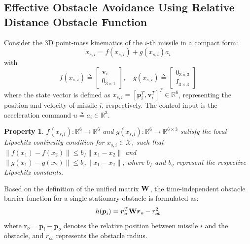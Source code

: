 \documentclass[lettersize,journal]{IEEEtran}
\newtheorem{property}{Property}
\begin{document}
\subsection{Effective Obstacle Avoidance Using Relative Distance Obstacle Function}
Consider the 3D point-mass kinematics of the $i$-th missile in a compact form:
\begin{equation}
	\label{obs_state}
	{\dot x_{s,i}} = f({x_{s,i}}) + g({x_{s,i}}){a_i}
\end{equation}
with
\begin{equation}
	f({x_{s,i}}) \triangleq \begin{bmatrix} {{\boldsymbol{v}}_i} \\ 0_{3\times1} \end{bmatrix}, \quad 
	g({x_{s,i}}) \triangleq \begin{bmatrix} 0_{3\times3} \\ I_{3\times3} \end{bmatrix}
\end{equation}
where the state vector is defined as $x_{s,i} = [{\boldsymbol{p}}_i^T, {\boldsymbol{v}}_i^T]^T \in \mathbb{R}^6$, representing the position and velocity of missile $i$, respectively. The control input is the acceleration command $u \triangleq a_i \in \mathbb{R}^3$. 
\vspace{1mm}
\begin{property}
	\label{Lipschitz}
	$f({x_{s,i}}): \mathbb{R}^6 \rightarrow \mathbb{R}^6$ and $g({x_{s,i}}): \mathbb{R}^6 \rightarrow \mathbb{R}^{6 \times 3}$ satisfy the local Lipschitz continuity condition for $x_{s,i} \in \mathcal{X}$, such that $\|f(x_1) - f(x_2)\| \le b_f \|x_1 - x_2\|$ and $\|g(x_1) - g(x_2)\| \le b_g \|x_1 - x_2\|$, where $b_f$ and $b_g$ represent the respective Lipschitz constants.
\end{property}
\vspace{1mm}

Based on the definition of the unified matrix ${\bf{W}}$, the time-independent obstacle barrier function for a single stationary obstacle is formulated as:
\begin{equation}
	h({{\boldsymbol{p}}_i}) = {\boldsymbol{r}}_o^T{\bf{W}}{{\boldsymbol{r}}_o} - r_{ob}^2
\end{equation}
where ${{\boldsymbol{r}}_o} = {{\boldsymbol{p}}_i} - {{\boldsymbol{p}}_o}$ denotes the relative position between missile $i$ and the obstacle, and $r_{ob}$ represents the obstacle radius.
\end{document}
